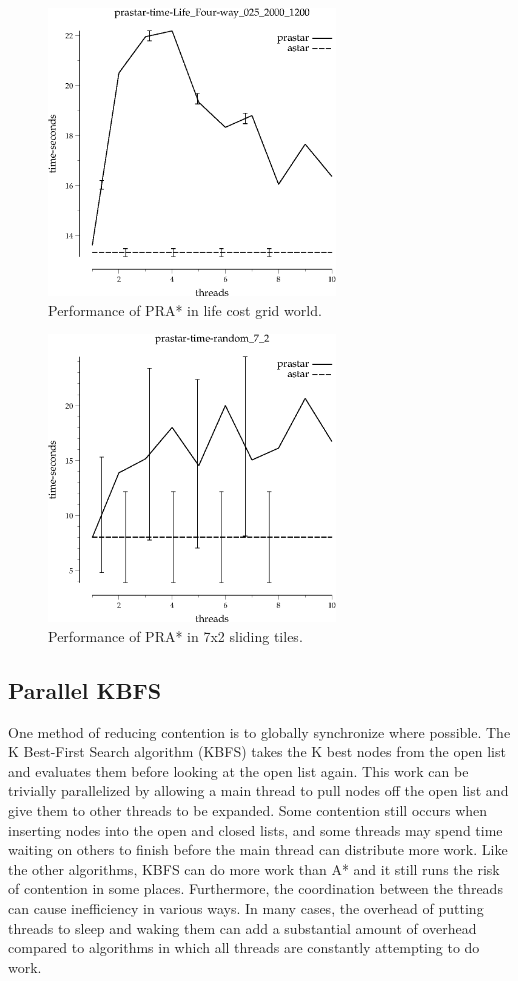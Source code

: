 \documentclass{article}
\begin{document}
\begin{figure}[h!]
\includegraphics[width=3in]{../graphs/seth/grid-life-single/PRAStar.eps}
\caption{Performance of PRA* in life cost grid world.}
\label{fig:PRAStar-life}
\end{figure}

\begin{figure}[h!]
\includegraphics[width=3in]{../graphs/seth/tiles-single/PRAStar.eps}
\caption{Performance of PRA* in 7x2 sliding tiles.}
\label{fig:PRAStar-life}
\end{figure}
\subsection{Parallel KBFS}
One method of reducing contention is to globally synchronize where possible. The K Best-First Search algorithm (KBFS) takes the K best nodes from the open list and evaluates them before looking at the open list again. This work can be trivially parallelized by allowing a main thread to pull nodes off the open list and give them to other threads to be expanded. Some contention still occurs when inserting nodes into the open and closed lists, and some threads may spend time waiting on others to finish before the main thread can distribute more work. Like the other algorithms, KBFS can do more work than A* and it still runs the risk of contention in some places. Furthermore, the coordination between the threads can cause inefficiency in various ways. In many cases, the overhead of putting threads to sleep and waking them can add a substantial amount of overhead compared to algorithms in which all threads are constantly attempting to do work.
\end{document}
